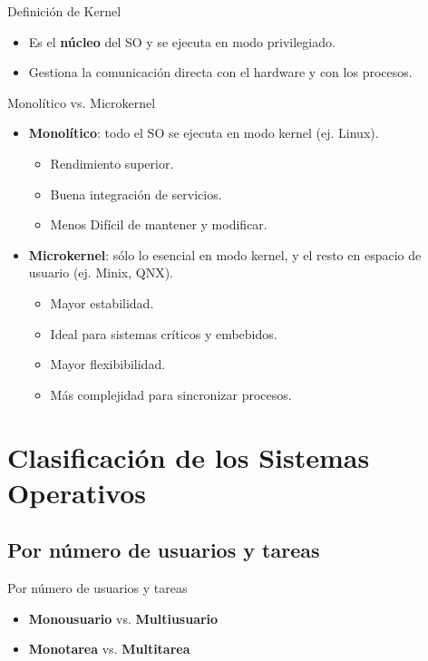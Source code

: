 \documentclass{beamer}
\begin{document}
\begin{frame}{Definición de Kernel}
    \begin{itemize}
        \item Es el \textbf{núcleo} del SO y se ejecuta en modo privilegiado.
        \item Gestiona la comunicación directa con el hardware y con los procesos.
    \end{itemize}
\end{frame}

\begin{frame}{Monolítico vs. Microkernel}
    \begin{itemize}
        \item \textbf{Monolítico}: todo el SO se ejecuta en modo kernel (ej. Linux).
        \begin{itemize}
            \item Rendimiento superior.
            \item Buena integración de servicios.
            \item Menos Difícil de mantener y modificar.
        \end{itemize}
        \item \textbf{Microkernel}: sólo lo esencial en modo kernel, y el resto en espacio de usuario (ej. Minix, QNX).
        \begin{itemize}
            \item Mayor estabilidad.
            \item Ideal para sistemas críticos y embebidos.
            \item Mayor flexibibilidad.
            \item Más complejidad para sincronizar procesos.
        \end{itemize}
    \end{itemize}
\end{frame}

\section{Clasificación de los Sistemas Operativos}

\subsection{Por número de usuarios y tareas}
\begin{frame}{Por número de usuarios y tareas}
    \begin{itemize}
        \item \textbf{Monousuario} vs. \textbf{Multiusuario}
        \item \textbf{Monotarea} vs. \textbf{Multitarea}
    \end{itemize}
\end{frame}
\end{document}
